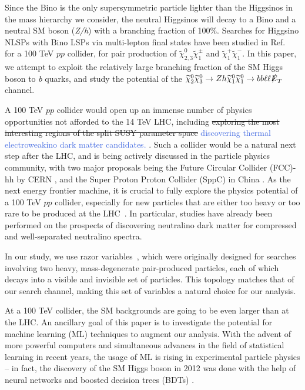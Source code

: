 \documentclass[a4paper,11pt]{article}
\newcommand{\ap}[1]{\textcolor{RoyalBlue}{#1}}
\newcommand{\N}{\widetilde{\chi}^0}
\newcommand{\C}{\widetilde{\chi}^\pm}
\newcommand{\met}{{\slashed{E}_T}}
\begin{document}
Since the Bino is the only supersymmetric particle lighter than the Higgsinos in
the mass hierarchy we consider, the neutral Higgsinos will decay to a Bino and a
neutral SM boson (\emph{Z/h}) with a branching fraction of 100\%.  Searches for
Higgsino NLSPs with Bino LSPs via  multi-lepton final states have been studied
in Ref.~\cite{Gori:2014oua} for a 100 TeV $pp$ collider, for pair production of
$\N_{2,3}\C_1$ and
$\widetilde\chi_{1}^+\widetilde\chi_1^-$. In this paper, we attempt to exploit
the relatively large branching fraction of the SM Higgs boson to \emph{b} quarks,
and study the potential of the $\N_2\N_3\rightarrow Zh
\N_1\N_1\rightarrow bb\ell\ell \met$ channel.

A 100 TeV $pp$ collider would open up an immense number of physics
opportunities not afforded to the 14 TeV LHC, including \st{exploring the most
interesting regions of the split SUSY parameter space} \ap{discovering thermal
electroweakino dark matter candidates.}
\cite{Arkani-Hamed:2015vfh}.
Such a collider would be a natural next step after the LHC, and is being
actively discussed in the particle physics community, with two major proposals
being the Future Circular Collider (FCC)-hh by CERN \cite{FCC-hh}, and the
Super Proton Proton Collider (SppC)  in China \cite{CEPC}.  As the next energy
frontier machine, it is crucial to fully explore the physics
potential of a 100 TeV $pp$ collider, especially for new particles that are
either too heavy or too rare to be produced at the
LHC~\cite{Arkani-Hamed:2015vfh,Contino:2016spe,Golling:2016gvc,Mangano:2016jyj}.
In particular, studies have already been performed on the prospects of
discovering neutralino dark matter for compressed \cite{Low:2014cba,
diCortona:2014yua,Cirelli:2014dsa,Mahbubani:2017gjh,Mahbubani:2018tin,Han:2018wus} and
well-separated \cite{Gori:2014oua,Acharya:2014pua} neutralino spectra.


In our study, we use razor variables~\cite{Rogan:2010kb}, which were originally designed
for searches involving two heavy, mass-degenerate pair-produced
particles, each of which decays into a visible and invisible set of
particles. This topology matches that of our search channel, making this
set of variables a natural choice for our analysis.  

At a 100 TeV collider, the  SM backgrounds are going to be even larger than
at the LHC.  An ancillary goal of this paper is to investigate the
potential for machine learning (ML) techniques to augment our analysis.
With the advent of more powerful computers and simultaneous advances in
the field of statistical learning in recent years, the usage of ML is
rising in experimental particle physics -- in fact, the discovery of the
SM Higgs boson in 2012 was done with the help of neural networks
\cite{Aad:2012tfa} and boosted decision trees (BDTs)
\cite{Chatrchyan:2012xdj}.
\end{document}
